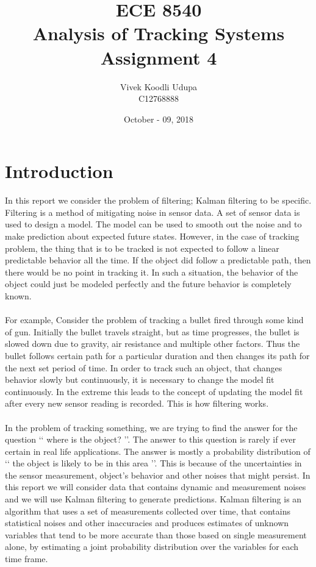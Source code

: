 \documentclass[12pt]{article}
\title{ECE 8540 \\ Analysis of Tracking Systems \\ 
	Assignment 4}
\author{Vivek Koodli Udupa \\ C12768888}
\date{October - 09, 2018 }
\begin{document}
\begin{titlepage}
\maketitle
{}%
\end{titlepage}



\section{Introduction}
In this report we consider the problem of filtering; Kalman filtering to be specific. Filtering is a method of mitigating noise in sensor data. A set of sensor data is used to design a model. The model can be used to smooth out the noise and to make prediction about expected future states. However, in the case of tracking problem, the thing that is to be tracked is not expected to follow a linear predictable behavior all the time. If the object did follow a predictable path, then there would be no point in tracking it. In such a situation, the behavior of the object could just be modeled perfectly and the future behavior is completely known.  \\
\\
For example, Consider the problem of tracking a bullet fired through some kind of gun. Initially the bullet travels straight, but as time progresses, the bullet is slowed down due to gravity, air resistance and multiple other factors. Thus the bullet follows certain path for a particular duration and then changes its path for the next set period of time. In order to track such an object, that changes behavior slowly but continuously, it is necessary to change the model fit continuously. In the extreme this leads to the concept of updating the model fit after every new sensor reading is recorded. This is how filtering works. \\
\\
In the problem of tracking something, we are trying to find the answer for the question \lq\lq{} where is the object? \rq\rq{}. The answer to this question is rarely if ever certain in real life applications. The answer is mostly a probability distribution of \lq\lq{} the object is likely to be in this area \rq\rq{}. This is because of the uncertainties in the sensor measurement, object's behavior and other noises that might persist. In this report we will consider data that contains dynamic and measurement noises and we will use Kalman filtering to generate predictions. Kalman filtering is an algorithm that uses a set of measurements collected over time, that contains statistical noises and other inaccuracies and produces estimates of unknown variables that tend to be more accurate than those based on single measurement alone, by estimating a joint probability distribution over the variables for each time frame.\\
\end{document}

